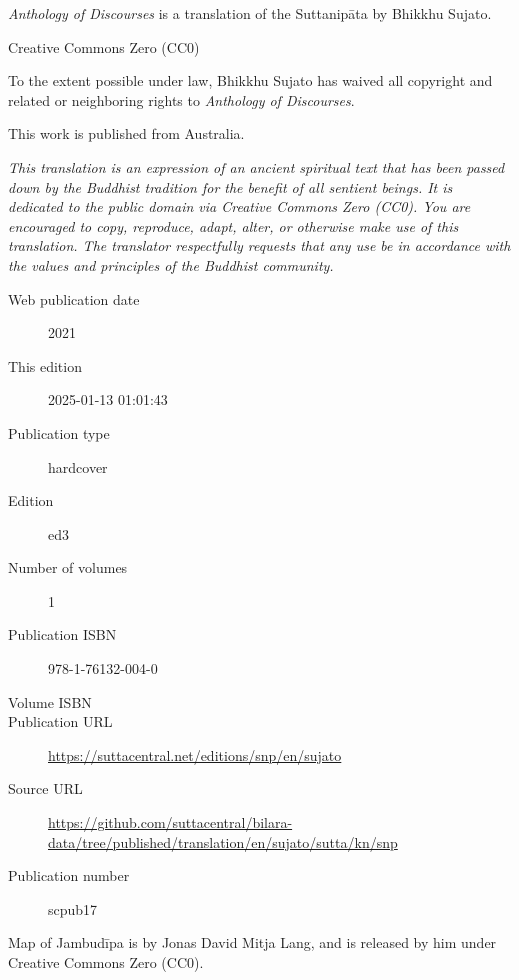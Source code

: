 \documentclass[12pt,openany]{book}%
\begin{document}
\begin{footnotesize}

\textit{Anthology of Discourses} is a translation of the Suttanipāta by Bhikkhu Sujato.

\medskip

Creative Commons Zero (CC0)

To the extent possible under law, Bhikkhu Sujato has waived all copyright and related or neighboring rights to \textit{Anthology of Discourses}.

\medskip

This work is published from Australia.

\begin{center}
\textit{This translation is an expression of an ancient spiritual text that has been passed down by the Buddhist tradition for the benefit of all sentient beings. It is dedicated to the public domain via Creative Commons Zero (CC0). You are encouraged to copy, reproduce, adapt, alter, or otherwise make use of this translation. The translator respectfully requests that any use be in accordance with the values and principles of the Buddhist community.}
\end{center}

\medskip

\begin{description}
    \item[Web publication date] 2021
    \item[This edition] 2025-01-13 01:01:43
    \item[Publication type] hardcover
    \item[Edition] ed3
    \item[Number of volumes] 1
    \item[Publication ISBN] 978-1-76132-004-0
    \item[Volume ISBN] 
    \item[Publication URL] \href{https://suttacentral.net/editions/snp/en/sujato}{https://suttacentral.net/editions/snp/en/sujato}
    \item[Source URL] \href{https://github.com/suttacentral/bilara-data/tree/published/translation/en/sujato/sutta/kn/snp}{https://github.com/suttacentral/bilara-data/tree/published/translation/en/sujato/sutta/kn/snp}
    \item[Publication number] scpub17
\end{description}

\medskip

Map of Jambudīpa is by Jonas David Mitja Lang, and is released by him under Creative Commons Zero (CC0).


\end{footnotesize}
\end{document}
